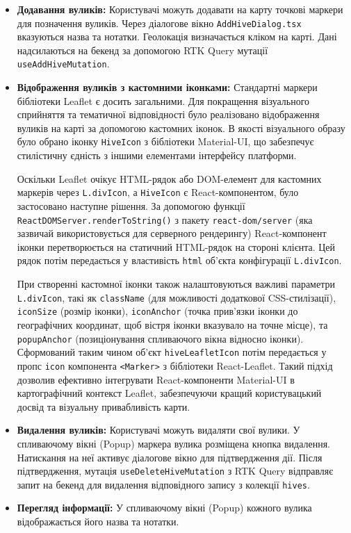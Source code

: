 \begin{itemize}
    \item \textbf{Додавання вуликів:} Користувачі можуть додавати на карту точкові маркери для позначення вуликів. Через діалогове вікно \texttt{AddHiveDialog.tsx} вказуються назва та нотатки. Геолокація визначається кліком на карті. Дані надсилаються на бекенд за допомогою RTK Query мутації \texttt{useAddHiveMutation}.
    
    \item \textbf{Відображення вуликів з кастомними іконками:} 
    Стандартні маркери бібліотеки Leaflet є досить загальними. Для покращення візуального сприйняття та тематичної відповідності було реалізовано відображення вуликів на карті за допомогою кастомних іконок. В якості візуального образу було обрано іконку \texttt{HiveIcon} з бібліотеки Material-UI, що забезпечує стилістичну єдність з іншими елементами інтерфейсу платформи. 
    
    Оскільки Leaflet очікує HTML-рядок або DOM-елемент для кастомних маркерів через \texttt{L.divIcon}, а \texttt{HiveIcon} є React-компонентом, було застосовано наступне рішення. За допомогою функції \texttt{ReactDOMServer.renderToString()} з пакету \texttt{react-dom/server} (яка зазвичай використовується для серверного рендерингу) React-компонент іконки перетворюється на статичний HTML-рядок на стороні клієнта. Цей рядок потім передається у властивість \texttt{html} об'єкта конфігурації \texttt{L.divIcon}. 
    
    При створенні кастомної іконки також налаштовуються важливі параметри \texttt{L.divIcon}, такі як \texttt{className} (для можливості додаткової CSS-стилізації), \texttt{iconSize} (розмір іконки), \texttt{iconAnchor} (точка прив'язки іконки до географічних координат, щоб вістря іконки вказувало на точне місце), та \texttt{popupAnchor} (позиціонування спливаючого вікна відносно іконки). Сформований таким чином об'єкт \texttt{hiveLeafletIcon} потім передається у пропс \texttt{icon} компонента \texttt{<Marker>} з бібліотеки React-Leaflet. Такий підхід дозволив ефективно інтегрувати React-компоненти Material-UI в картографічний контекст Leaflet, забезпечуючи кращий користувацький досвід та візуальну привабливість карти.

    \item \textbf{Видалення вуликів:} Користувачі можуть видаляти свої вулики. У спливаючому вікні (Popup) маркера вулика розміщена кнопка видалення. Натискання на неї активує діалогове вікно для підтвердження дії. Після підтвердження, мутація \texttt{useDeleteHiveMutation} з RTK Query відправляє запит на бекенд для видалення відповідного запису з колекції \texttt{hives}.
    \item \textbf{Перегляд інформації:} У спливаючому вікні (Popup) кожного вулика відображається його назва та нотатки.
\end{itemize}

